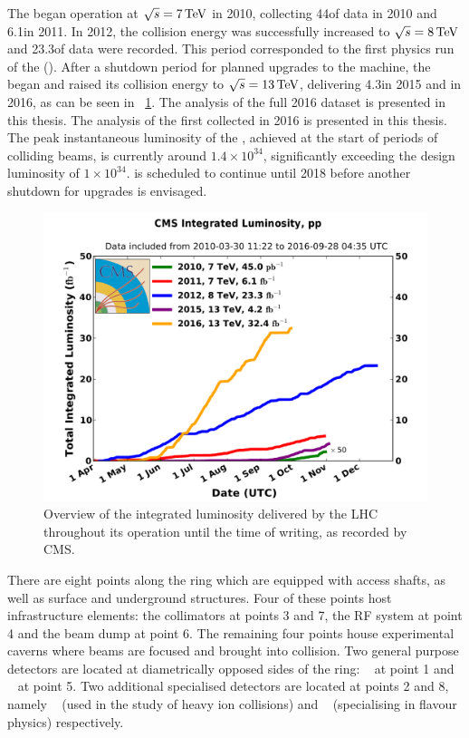 The \LHC began operation at $\sqrt{s}=7\,\text{Te\hspace{-.08em}V}$ in 2010, collecting 44\ipb of data in 2010 and 6.1\ifb in 2011. In 2012, the collision energy was successfully increased to $\sqrt{s}=8\,\text{Te\hspace{-.08em}V}$ and 23.3\ifb of data were recorded. This period corresponded to the first physics run of the \LHC (\RunI). After a shutdown period for planned upgrades to the machine, the \LHC began \RunII and raised its collision energy to $\sqrt{s}=13\,\text{Te\hspace{-.08em}V}$, delivering 4.3\ifb in 2015 and \totaldatatwentysixteen\ifb in 2016, as can be seen in \Fig~\ref{fig:totalintlumi}. 
\ifNewAnalysis
The analysis of the full 2016 dataset is presented in this thesis.
\else
The analysis of the first \thisanalysislumi\ifb collected in 2016 is presented in this thesis.
\fi
The peak instantaneous luminosity of the \LHC, achieved at the start of periods of colliding beams, is currently around $1.4 \times 10^{34}$\lumiunits, significantly exceeding the design luminosity of $1 \times 10^{34}$\lumiunits. \RunII is scheduled to continue until 2018 before another shutdown for upgrades is envisaged. 

\begin{figure}[h]
\centering
\includegraphics[width=1.0\textwidth]{detectorFigures/int_lumi_cumulative_pp_2_280916.pdf}
\caption{Overview of the integrated luminosity delivered by the LHC throughout its operation until the time of writing, as recorded by CMS.~~\cite{CMSLumiPublic}}
\label{fig:totalintlumi}
\end{figure}

There are eight points along the \LHC ring which are equipped with access shafts, as well as surface and underground structures. Four of these points host \LHC infrastructure elements: the collimators at points 3 and 7, the RF system at point 4 and the beam dump at point 6. The remaining four points house experimental caverns where beams are focused and brought into collision. Two general purpose detectors are located at diametrically opposed sides of the ring: \ATLAS~\cite{AtlasatLHC} at point 1 and \CMS~\cite{CMSatLHC} at point 5. Two additional specialised detectors are located at points 2 and 8, namely \ALICE~\cite{AliceatLHC} (used in the study of heavy ion collisions) and \LHCb~\cite{LHCbatLHC} (specialising in flavour physics) respectively. 




